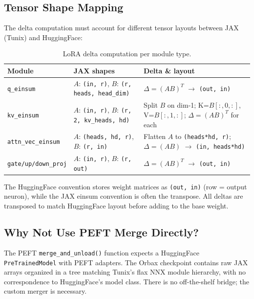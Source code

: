 \documentclass[11pt,a4paper]{article}
\begin{document}
\subsection{Tensor Shape Mapping}

The delta computation must account for different tensor layouts between JAX (Tunix) and HuggingFace:

\begin{table}[H]
\centering
\caption{LoRA delta computation per module type.}
\small
\begin{tabular}{p{3cm}p{4.5cm}p{4.5cm}}
\toprule
\textbf{Module} & \textbf{JAX shapes} & \textbf{Delta \& layout} \\
\midrule
\texttt{q\_einsum} & $A$: \texttt{(in, r)}, $B$: \texttt{(r, heads, head\_dim)} & $\Delta = (AB)^T$ $\rightarrow$ \texttt{(out, in)} \\
\texttt{kv\_einsum} & $A$: \texttt{(in, r)}, $B$: \texttt{(r, 2, kv\_heads, hd)} & Split $B$ on dim-1; K=$B[:,0,:]$, V=$B[:,1,:]$; $\Delta = (AB)^T$ for each \\
\texttt{attn\_vec\_einsum} & $A$: \texttt{(heads, hd, r)}, $B$: \texttt{(r, in)} & Flatten $A$ to \texttt{(heads*hd, r)}; $\Delta = (AB)$ $\rightarrow$ \texttt{(in, heads*hd)} \\
\texttt{gate/up/down\_proj} & $A$: \texttt{(in, r)}, $B$: \texttt{(r, out)} & $\Delta = (AB)^T$ $\rightarrow$ \texttt{(out, in)} \\
\bottomrule
\end{tabular}
\end{table}

The HuggingFace convention stores weight matrices as \texttt{(out, in)} (row = output neuron), while the JAX einsum convention is often the transpose. All deltas are transposed to match HuggingFace layout before adding to the base weight.

\subsection{Why Not Use PEFT Merge Directly?}

The PEFT \texttt{merge\_and\_unload()} function expects a HuggingFace \texttt{PreTrainedModel} with PEFT adapters. The Orbax checkpoint contains raw JAX arrays organized in a tree matching Tunix's flax NNX module hierarchy, with no correspondence to HuggingFace's model class. There is no off-the-shelf bridge; the custom merger is necessary.

\end{document}
